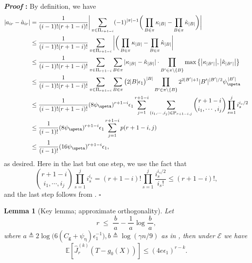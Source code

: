 \documentclass{article}
\def\eps{{\epsilon}}
\def\gE{{\mathcal{E}}}
\newcommand{\E}{\mathbb{E}}
\def\defeq{\triangleq} %
\newtheorem{lemma}{Lemma}[section]
\renewenvironment{proof}{\noindent\textbf{\textit{Proof }:}}{\hfill$\square$}
\begin{document}
\begin{proof}
    By definition, we have
    \begin{equation}
        \notag
        \begin{aligned}
            |a_{ir}-\hat{a}_{ir}| &= \frac{1}{(i-1)!(r+1-i)!} \bigg| \sum_{\pi\in\Pi_{r+1-i}} (-1)^{|\pi|-1} \bigg(\prod_{B\in\pi}\kappa_{|B|}-\prod_{B\in\pi}\hat{\kappa}_{|B|}\bigg)\bigg| \\
            &\leq  \frac{1}{(i-1)!(r+1-i)!} \sum_{\pi\in\Pi_{r+1-i}}\bigg|\bigg(\prod_{B\in\pi}\kappa_{|B|}-\prod_{B\in\pi}\hat{\kappa}_{|B|}\bigg| \\
            &\leq \frac{1}{(i-1)!(r+1-i)!} \sum_{\pi\in\Pi_{r+1-i}}\sum_{B\in\pi} |\kappa_{|B|}-\hat{\kappa}_{|B|}|\cdot\prod_{B'\in\pi\setminus\{B\}} \max\big\{\big|\kappa_{|B'|}\big|, \big|\hat{\kappa}_{|B'|}\big|\big\} \\
            &\leq \frac{1}{(i-1)!(r+1-i)!} \sum_{\pi\in\Pi_{r+1-i}}\sum_{B\in\pi} \big(2|B|\eps_1\big)^{|B|}\prod_{B'\in\pi\setminus\{B\}} 2^{2|B'|+1}|B'|^{|B'|/2}\psi_{\upeta}^{\,|B'|} \\
            &\leq \frac{1}{(i-1)!(r+1-i)!} (8\psi_{\upeta})^{r+1-i} \eps_1 \sum_{j=1}^{r+1-i} \sum_{(i_1,\cdots,i_j)\in\mathrm{P}_{r+1-i,j}} \binom{r+1-i}{i_1,\cdots,i_j}\prod_{s=1}^j i_s^{i_s/2} \\
            &\leq \frac{1}{(i-1)!} (8\psi_{\upeta})^{r+1-i} \eps_1 \sum_{j=1}^{r+1-i} p(r+1-i,j) \\
            &\leq \frac{1}{(i-1)!} (16\psi_{\upeta})^{r+1-i} \eps_1,
        \end{aligned}
    \end{equation}
    as desired. Here in the last but one step, we use the fact that
    \[
    \binom{r+1-i}{i_1,\cdots,i_j}\prod_{s=1}^j i_s^{i_s} = (r+1-i)!\prod_{s=1}^j \frac{i_s^{i_s/2}}{i_s!} \leq (r+1-i)!,
    \]
    and the last step follows from .
\end{proof}

\begin{lemma}[Key lemma; approximate orthogonality]
    \label{lemma:derivative-expectation}
    Let 
    \begin{equation}\label{eq:bias-cond-repeat}
      r\;\le\;
      \frac{b}{\,a\,}-\frac{1}{\,a\,}\log\!\frac{b}{\,a\,},
    \end{equation}
    where $a\defeq  2\log\big(6(C_{\mathsf{g}}+\psi_{\upeta})\eps_1^{-1}\big),
b\defeq \log(\gamma n/9)$ as in , then under $\gE$ we have 
    $$\E\left[\hat{J}_r^{(k)}(T-g_0(X))\right] \leq  (4e\eps_1)^{r-k}.$$
\end{lemma}
\end{document}
